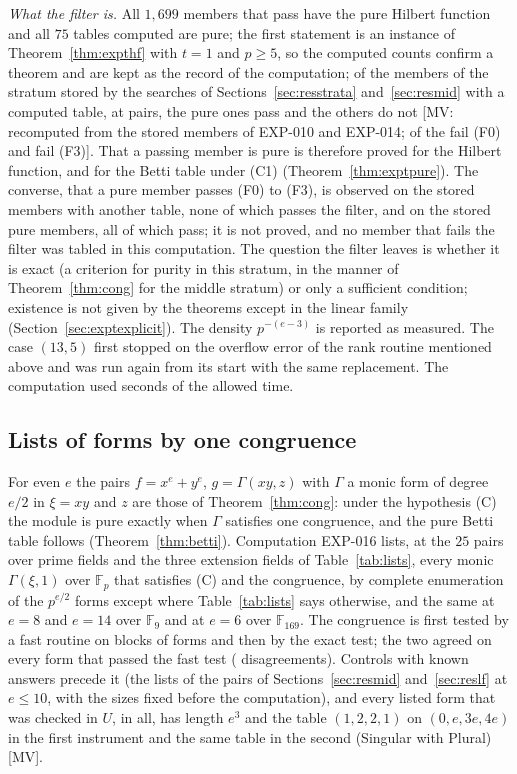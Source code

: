 \documentclass[11pt]{article}
\theoremstyle{definition}
\theoremstyle{remark}
\newcommand{\EXP}[1]{\mbox{EXP-#1}}
\newcommand{\F}{\mathbb{F}}
\begin{document}
\emph{What the filter is.} All $1{,}699$ members that pass have the pure Hilbert function and all $75$ tables computed are pure; the first statement is an instance of Theorem~\ref{thm:expthf} with $t=1$ and $p\ge5$, so the computed counts confirm a theorem and are kept as the record of the computation; of the \nstmTabled{} members of the stratum stored by the searches of Sections~\ref{sec:resstrata} and~\ref{sec:resmid} with a computed table, at \nstmPairs{} pairs, the \nstmPure{} pure ones pass and the \nstmOther{} others do not [MV: recomputed from the stored members of \EXP{010} and \EXP{014}; \nstmFailFZero{} of the \nstmOther{} fail (F0) and \nstmFailFThree{} fail (F3)]. That a passing member is pure is therefore proved for the Hilbert function, and for the Betti table under (C1) (Theorem~\ref{thm:exptpure}). The converse, that a pure member passes (F0) to (F3), is observed on the \nstmOther{} stored members with another table, none of which passes the filter, and on the stored pure members, all of which pass; it is not proved, and no member that fails the filter was tabled in this computation. The question the filter leaves is whether it is exact (a criterion for purity in this stratum, in the manner of Theorem~\ref{thm:cong} for the middle stratum) or only a sufficient condition; existence is not given by the theorems except in the linear family (Section~\ref{sec:exptexplicit}). The density $p^{-(e-3)}$ is reported as measured. The case $(13,5)$ first stopped on the overflow error of the rank routine mentioned above and was run again from its start with the same replacement. The computation used \nfltSeconds{} seconds of the allowed time.

\subsection{Lists of forms by one congruence}
\label{sec:reslists}

For even $e$ the pairs $f=x^e+y^e$, $g=\Gamma(xy,z)$ with $\Gamma$ a monic form of degree $e/2$ in $\xi=xy$ and $z$ are those of Theorem~\ref{thm:cong}: under the hypothesis (C) the module is pure exactly when $\Gamma$ satisfies one congruence, and the pure Betti table follows (Theorem~\ref{thm:betti}). Computation \EXP{016} lists, at the $25$ pairs over prime fields and the three extension fields of Table~\ref{tab:lists}, every monic $\Gamma(\xi,1)$ over $\F_p$ that satisfies (C) and the congruence, by complete enumeration of the $p^{e/2}$ forms except where Table~\ref{tab:lists} says otherwise, and the same at $e=8$ and $e=14$ over $\F_9$ and at $e=6$ over $\F_{169}$. The congruence is first tested by a fast routine on blocks of forms and then by the exact test; the two agreed on every form that passed the fast test (\nlstFastNotExact{} disagreements). Controls with known answers precede it (the lists of the pairs of Sections~\ref{sec:resmid} and~\ref{sec:reslf} at $e\le10$, with the sizes fixed before the computation), and every listed form that was checked in $U$, \nlstVerified{} in all, has length $e^3$ and the table $(1,2,2,1)$ on $(0,e,3e,4e)$ in the first instrument and the same table in the second (Singular with Plural) [MV].
\end{document}
